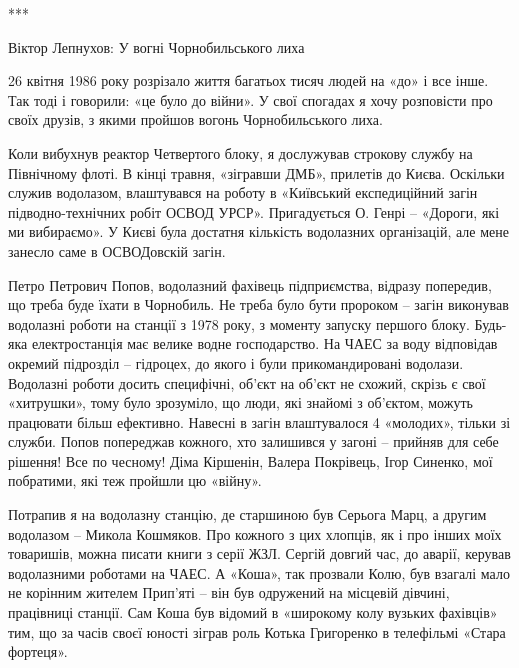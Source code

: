 ***

Віктор Лепнухов: У вогні Чорнобильського лиха

26 квітня 1986 року розрізало життя багатьох тисяч людей на «до» і все інше.
Так тоді і говорили: «це було до війни». У свої спогадах я хочу розповісти про
своїх друзів, з якими пройшов вогонь Чорнобильського лиха.


Коли вибухнув реактор Четвертого блоку, я дослужував строкову службу на
Північному флоті. В кінці травня, «зігравши ДМБ», прилетів до Києва. Оскільки
служив водолазом, влаштувався на роботу в «Київський експедиційний загін
підводно-технічних робіт ОСВОД УРСР». Пригадується О. Генрі – «Дороги, які ми
вибираємо». У Києві була достатня кількість водолазних організацій, але мене
занесло саме в ОСВОДовскій загін.


Петро Петрович Попов, водолазний фахівець підприємства, відразу попередив, що
треба буде їхати в Чорнобиль. Не треба було бути пророком – загін виконував
водолазні роботи на станції з 1978 року, з моменту запуску першого блоку.
Будь-яка електростанція має велике водне господарство. На ЧАЕС за воду
відповідав окремий підрозділ – гідроцех, до якого і були прикомандировані
водолази. Водолазні роботи досить специфічні, об'єкт на об'єкт не схожий,
скрізь є свої «хитрушки», тому було зрозуміло, що люди, які знайомі з об'єктом,
можуть працювати більш ефективно. Навесні в загін влаштувалося 4 «молодих»,
тільки зі служби. Попов попереджав кожного, хто залишився у загоні – прийняв
для себе рішення! Все по чесному! Діма Кіршенін, Валера Покрівець, Ігор
Синенко, мої побратими, які теж пройшли цю «війну».


Потрапив я на водолазну станцію, де старшиною був Серьога Марц, а другим
водолазом – Микола Кошмяков. Про кожного з цих хлопців, як і про інших моїх
товаришів, можна писати книги з серії ЖЗЛ. Сергій довгий час, до аварії,
керував водолазними роботами на ЧАЕС. А «Коша», так прозвали Колю, був взагалі
мало не корінним жителем Прип'яті – він був одружений на місцевій дівчині,
працівниці станції. Сам Коша був відомий в «широкому колу вузьких фахівців»
тим, що за часів своєї юності зіграв роль Котька Григоренко в телефільмі «Стара
фортеця».


